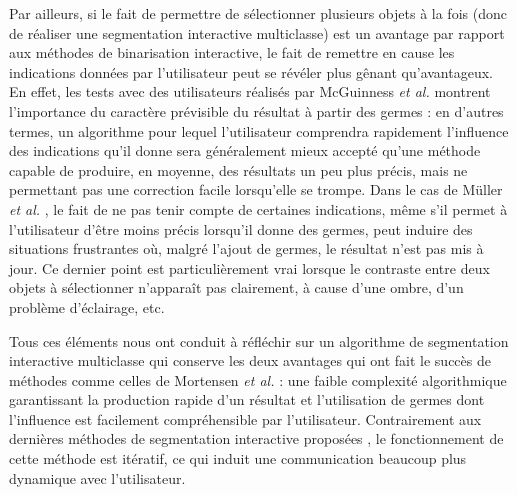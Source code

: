 \begin{emodif}
Par ailleurs, si le fait de permettre de sélectionner plusieurs objets à la fois (donc de réaliser une segmentation interactive multiclasse) est un avantage par rapport aux méthodes de binarisation interactive, le fait de remettre en cause les indications données par l'utilisateur peut se révéler plus gênant qu'avantageux. En effet, les tests avec des utilisateurs réalisés par McGuinness \textit{et al.} \cite{mcguinness2010comparative} montrent l'importance du caractère prévisible du résultat à partir des germes : en d'autres termes, un algorithme pour lequel l'utilisateur comprendra rapidement l'influence des indications qu'il donne sera généralement mieux accepté qu'une méthode capable de produire, en moyenne, des résultats un peu plus précis, mais ne permettant pas une correction facile lorsqu'elle se trompe. Dans le cas  de Müller \textit{et al.} \cite{muller2016robust}, le fait de ne pas tenir compte de certaines indications, même s'il  permet à l'utilisateur d'être moins précis lorsqu'il donne des germes, peut induire des situations frustrantes où, malgré l'ajout de germes, le résultat n'est pas mis à jour. Ce dernier point est particulièrement vrai lorsque le contraste entre deux objets à sélectionner n'apparaît pas clairement, à cause d'une ombre, d'un problème d'éclairage, etc.

Tous ces éléments nous ont conduit à réfléchir sur un algorithme de segmentation interactive multiclasse qui conserve les deux avantages qui ont fait le succès de méthodes comme celles de Mortensen \textit{et al.} : une faible complexité algorithmique garantissant la production rapide d'un résultat et  l'utilisation de germes dont l'influence est facilement compréhensible par l'utilisateur. Contrairement aux dernières méthodes de segmentation interactive proposées \cite{Changjae2017Robust,muller2016robust,santner2010interactive}, le fonctionnement de cette méthode est itératif, ce qui induit une communication beaucoup plus dynamique avec l'utilisateur.
\end{emodif} 

